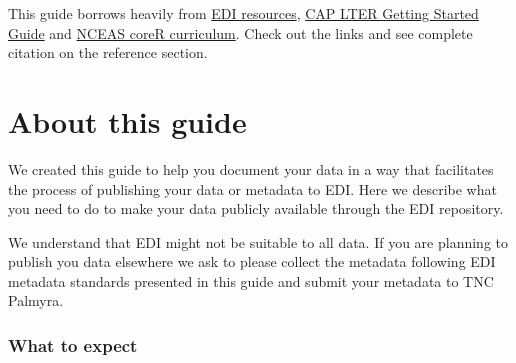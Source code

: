 \documentclass[
  letterpaper,
  DIV=11,
  numbers=noendperiod]{scrreprt}
\begin{document}
\begin{tcolorbox}[enhanced jigsaw, colbacktitle=quarto-callout-note-color!10!white, title=\textcolor{quarto-callout-note-color}{\faInfo}\hspace{0.5em}{Note}, colframe=quarto-callout-note-color-frame, arc=.35mm, rightrule=.15mm, colback=white, toptitle=1mm, titlerule=0mm, toprule=.15mm, bottomtitle=1mm, bottomrule=.15mm, leftrule=.75mm, opacityback=0, breakable, coltitle=black, opacitybacktitle=0.6, left=2mm]
This guide borrows heavily from
\href{https://edirepository.org/resources/resources-for-data-authors}{EDI
resources},
\href{https://caplter.github.io/caplter_ezeml/\#getting-started}{CAP
LTER Getting Started Guide} and
\href{https://www.nceas.ucsb.edu/learning-hub/core-r}{NCEAS coreR
curriculum}. Check out the links and see complete citation on the
reference section.
\end{tcolorbox}


\hypertarget{about-this-guide}{%
\chapter*{About this guide}\label{about-this-guide}}

We created this guide to help you document your data in a way that
facilitates the process of publishing your data or metadata to EDI. Here
we describe what you need to do to make your data publicly available
through the EDI repository.

\begin{tcolorbox}[enhanced jigsaw, colbacktitle=quarto-callout-important-color!10!white, title=\textcolor{quarto-callout-important-color}{\faExclamation}\hspace{0.5em}{Important}, colframe=quarto-callout-important-color-frame, arc=.35mm, rightrule=.15mm, colback=white, toptitle=1mm, titlerule=0mm, toprule=.15mm, bottomtitle=1mm, bottomrule=.15mm, leftrule=.75mm, opacityback=0, breakable, coltitle=black, opacitybacktitle=0.6, left=2mm]
We understand that EDI might not be suitable to all data. If you are
planning to publish you data elsewhere we ask to please collect the
metadata following EDI metadata standards presented in this guide and
submit your metadata to TNC Palmyra.
\end{tcolorbox}

\hypertarget{what-to-expect}{%
\subsection*{What to expect}\label{what-to-expect}}
\end{document}
